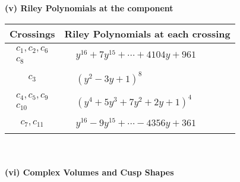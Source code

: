 \documentclass[1p]{elsarticle_modified}
\theoremstyle{definition}
\begin{document}
\newpage\renewcommand{\arraystretch}{1}
\flushleft \textbf{(v) Riley Polynomials at the component}\newline \\
\begin{tabular}{m{50pt}|m{274pt}}
Crossings & \hspace{64pt}Riley Polynomials at each crossing \\
\hline $$\begin{aligned}c_{1},c_{2},c_{6}\\c_{8}\end{aligned}$$&$\begin{aligned}
&y^{16}+7 y^{15}+\cdots+4104 y+961
\end{aligned}$\\
\hline $$\begin{aligned}c_{3}\end{aligned}$$&$\begin{aligned}
&(y^2-3 y+1)^8
\end{aligned}$\\
\hline $$\begin{aligned}c_{4},c_{5},c_{9}\\c_{10}\end{aligned}$$&$\begin{aligned}
&(y^4+5 y^3+7 y^2+2 y+1)^4
\end{aligned}$\\
\hline $$\begin{aligned}c_{7},c_{11}\end{aligned}$$&$\begin{aligned}
&y^{16}-9 y^{15}+\cdots-4356 y+361
\end{aligned}$\\
\hline
\end{tabular}\\~\\
\newpage\flushleft \textbf{(vi) Complex Volumes and Cusp Shapes}
\end{document}

